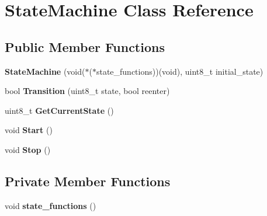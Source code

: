\hypertarget{class_state_machine}{}\section{State\+Machine Class Reference}
\label{class_state_machine}
\subsection*{Public Member Functions}
\begin{DoxyCompactItemize}
\item 
{\bfseries State\+Machine} (void($\ast$($\ast$state\+\_\+functions))(void), uint8\+\_\+t initial\+\_\+state)\hypertarget{class_state_machine_a4446455ccfb1638fc70c59143082ecb4}{}\label{class_state_machine_a4446455ccfb1638fc70c59143082ecb4}

\item 
bool {\bfseries Transition} (uint8\+\_\+t state, bool reenter)\hypertarget{class_state_machine_a1597799edc5a89006f164e52fd72d02b}{}\label{class_state_machine_a1597799edc5a89006f164e52fd72d02b}

\item 
uint8\+\_\+t {\bfseries Get\+Current\+State} ()\hypertarget{class_state_machine_a62fd24666d16a2425c8397ce2d326dae}{}\label{class_state_machine_a62fd24666d16a2425c8397ce2d326dae}

\item 
void {\bfseries Start} ()\hypertarget{class_state_machine_a94c93f8203bab4f5a3784eba7445b582}{}\label{class_state_machine_a94c93f8203bab4f5a3784eba7445b582}

\item 
void {\bfseries Stop} ()\hypertarget{class_state_machine_a2eb142249e4c483c8a329b1a18b4383f}{}\label{class_state_machine_a2eb142249e4c483c8a329b1a18b4383f}

\end{DoxyCompactItemize}
\subsection*{Private Member Functions}
\begin{DoxyCompactItemize}
\item 
void {\bfseries state\+\_\+functions} ()\hypertarget{class_state_machine_acc87359cd98c436f5b891ffe6cb67160}{}\label{class_state_machine_acc87359cd98c436f5b891ffe6cb67160}

\end{DoxyCompactItemize}
